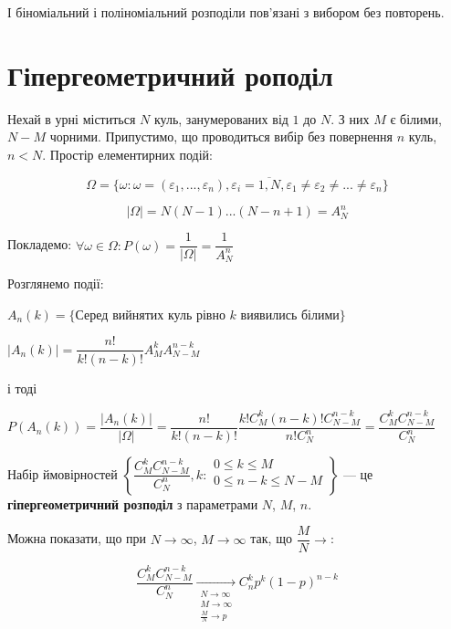 \begin{remark}
    І біноміальний і поліноміальний розподіли пов'язані з вибором без повторень.
\end{remark}

\section{Гіпергеометричний роподіл}

Нехай в урні міститься $N$ куль, занумерованих від $1$ до $N$. З них $M$ є білими,
$N-M$ чорними. Припустимо, що проводиться вибір без повернення $n$ куль,
$n < N$. Простір елементирних подій: 

$$\Omega = \{\omega: \omega = (\varepsilon_1, ..., \varepsilon_n),
    \varepsilon_i = \overline{1, N},
    \varepsilon_1 \neq \varepsilon_2 \neq ... \neq \varepsilon_n\}$$

$$|\Omega| = N(N-1)...(N-n+1) = A_N^n$$

Покладемо: $\forall \omega \in \Omega: P(\omega) = \dfrac{1}{|\Omega|} = \dfrac{1}{A_N^n}$

Розглянемо події:

$A_n(k) = \{$Серед  вийнятих куль рівно $k$ виявились білими$\}$

$|A_n(k)| = \dfrac{n!}{k!(n-k)!} A_M^k A_{N-M}^{n-k}$

і тоді 

$P(A_n(k)) = \dfrac{|A_n(k)|}{|\Omega|}
= \dfrac{n!}{k!(n-k)!} \dfrac{k! C_M^k (n-k)! C_{N-M}^{n-k}}{n!C_N^n}
= \dfrac{C_M^k C_{N-M}^{n-k}}{C_N^n}$
\begin{definition}    
    Набір ймовірностей 
    $\left\{ \dfrac{C_M^k C_{N-M}^{n-k}}{C_N^n}, k: \begin{array}{l}
        0 \leqslant k \leqslant M \\
        0 \leqslant n-k \leqslant N-M \\
    \end{array} \right\}$ --- це \textbf{гіпергеометричний розподіл}
    з параметрами $N$, $M$, $n$.
\end{definition}

Можна показати, що при $N \rightarrow \infty$, $M \rightarrow \infty$
так, що $\dfrac{M}{N} \rightarrow$:

$$\dfrac{C_M^k C_{N-M}^{n-k}}{C_N^n} \xrightarrow[\begin{matrix}
    \scriptstyle N \rightarrow \infty\\
    \scriptstyle M \rightarrow \infty\\
    \scriptstyle \frac{M}{N} \rightarrow p\\
\end{matrix}]{} C_n^k p^k(1-p)^{n-k}$$

